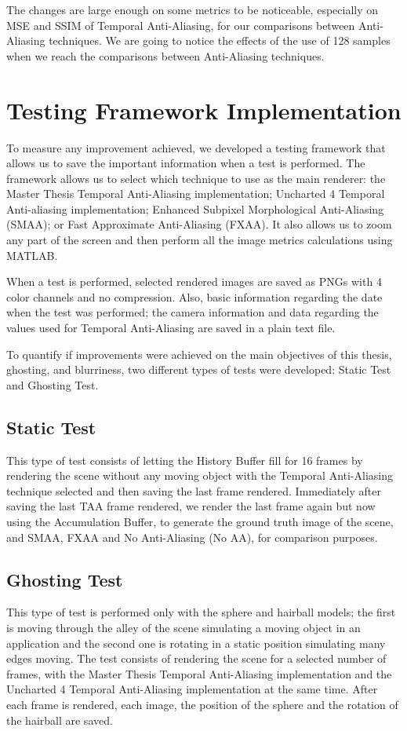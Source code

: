 \documentclass{cslthse-msc}
\begin{document}
The changes are large enough on some metrics to be noticeable, especially on MSE and SSIM of Temporal Anti-Aliasing, for our comparisons between Anti-Aliasing techniques. We are going to notice the effects of the use of 128 samples when we reach the comparisons between Anti-Aliasing techniques.

\section{Testing Framework Implementation}
To measure any improvement achieved, we developed a testing framework that allows us to save the important information when a test is performed. The framework allows us to select which technique to use as the main renderer: the Master Thesis Temporal Anti-Aliasing implementation; Uncharted 4 Temporal Anti-aliasing implementation; Enhanced Subpixel Morphological Anti-Aliasing (SMAA); or Fast Approximate Anti-Aliasing (FXAA). It also allows us to zoom any part of the screen and then perform all the image metrics calculations using MATLAB.

When a test is performed, selected rendered images are saved as PNGs with 4 color channels and no compression. Also, basic information regarding the date when the test was performed; the camera information and data regarding the values used for Temporal Anti-Aliasing are saved in a plain text file.

To quantify if improvements were achieved on the main objectives of this thesis, ghosting, and blurriness, two different types of tests were developed: Static Test and Ghosting Test.

\subsection{Static Test}
This type of test consists of letting the History Buffer fill for 16 frames by rendering the scene without any moving object with the Temporal Anti-Aliasing technique selected and then saving the last frame rendered. Immediately after saving the last TAA frame rendered, we render the last frame again but now using the Accumulation Buffer, to generate the ground truth image of the scene, and SMAA, FXAA and No Anti-Aliasing (No AA), for comparison purposes. 

\subsection{Ghosting Test}
This type of test is performed only with the sphere and hairball models; the first is moving through the alley of the scene simulating a moving object in an application and the second one is rotating in a static position simulating many edges moving. The test consists of rendering the scene for a selected number of frames, with the Master Thesis Temporal Anti-Aliasing implementation and the Uncharted 4 Temporal Anti-Aliasing implementation at the same time. After each frame is rendered, each image, the position of the sphere and the rotation of the hairball are saved.
\end{document}
